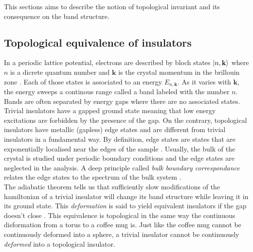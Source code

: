 This sections aims to describe the notion of topological invariant and its consequence on the band structure. 
\subsection{Topological equivalence of insulators \label{subsec:Top_Band}}
In a periodic lattice potential, electrons are described by bloch states $\ket{n, \mathbf{k}}$ where $n$ is a dicrete quantum number and $\mathbf{k}$ is the crystal momentum in the brillouin zone \cite{girvin_modern_2019}. Each of those states is associated to an energy $E_{n, \mathbf{k}}$.  As it varies with $\mathbf{k}$, the energy sweeps a continous range called a band labeled with the number $n$. Bands are often separated by energy gaps where there are no associated states. Trivial insulators have a gapped ground state meaning that low energy excitations are forbidden by the presence of the gap. On the contrary, topological insulators have metallic (gapless) edge states\cite{kane_topological_2013} and are different from trivial insulators in a fundamental way. By definition, edge states are states that are exponentially localised near the edges of the sample \cite{asboth_short_2016}. Usually, the bulk of the crystal is studied under periodic boundary conditions and the edge states are neglected in the analysis. A deep principle called \textit{bulk boundary correspondance} relates the edge states to the spectrum of the bulk system \cite{kush_bulk-edge_nodate}. \\ 


The adiabatic theorem tells us that sufficiently slow modifications of the hamiltonian of a trivial insulator will change its band structure while leaving it in its ground state\cite{born_beweis_1928}. This \textit{deformation} is said to yield equivalent insulators if the gap doesn't close \cite{kane_topological_2013}. This equivalence is topological in the same way the continuous disformation from a torus to a coffee mug is. Just like the coffee mug cannot be continuously deformed into a sphere, a trivial insulator cannot be continuously \textit{deformed} into a topological insulator.\\

